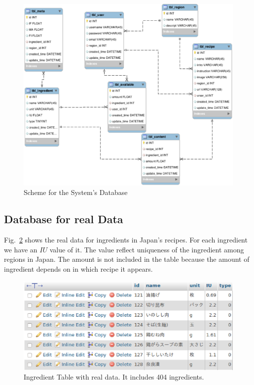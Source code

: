 \begin{figure}
\centering
\includegraphics[scale=0.5]{scheme.eps}
\caption{Scheme for the System's Database}
\label{fig:scheme}

\end{figure}

\subsection{Database for real Data}

Fig.~\ref{fig:ingredient} shows the real data for ingredients in Japan's recipes. For each ingredient we have an $IU$ value of it. The value reflect uniqueness of the ingredient among regions in Japan. The amount is not included in the table because the amount of ingredient depends on in which recipe it appears.
 
\begin{figure}
\centering
\includegraphics[scale=0.5]{ingredient.eps}
\caption{Ingredient Table with real data. It includes 404 ingredients.}
\label{fig:ingredient}
\end{figure}

